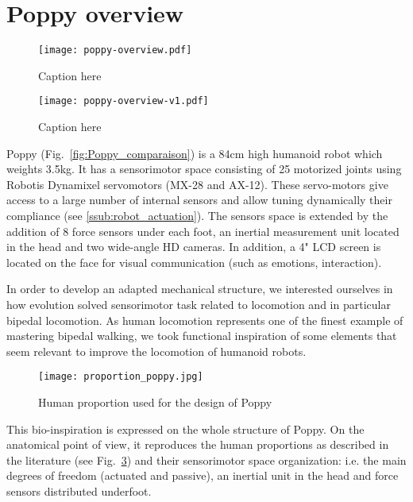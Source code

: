 \section{Poppy overview} %

\begin{figure}[tb]
    \begin{center}
        \texttt{[image: poppy-overview.pdf]}
    \end{center}
    \caption{Caption here}
    \label{fig:poppyv0.1_overview}
\end{figure}

\begin{figure}[tb]
    \begin{center}
        \texttt{[image: poppy-overview-v1.pdf]}
    \end{center}
    \caption{Caption here}
    \label{fig:poppyv1_overview}
\end{figure}

Poppy (Fig.~\ref{fig:Poppy_comparaison}) is a 84cm high humanoid robot which weights 3.5kg.
It has a sensorimotor space consisting of 25 motorized joints using Robotis Dynamixel servomotors (MX-28 and AX-12).
These servo-motors give access to a large number of internal sensors and allow tuning dynamically their compliance (see \ref{ssub:robot_actuation}).
The sensors space is extended by the addition of 8 force sensors under each foot, an inertial measurement unit located in the head and two wide-angle HD cameras.
In addition, a 4" LCD screen is located on the face for visual communication (such as emotions, interaction).


In order to develop an adapted mechanical structure, we interested ourselves in how evolution solved sensorimotor task related to locomotion and in particular bipedal locomotion.
As human locomotion represents one of the finest example of mastering bipedal walking, we took functional inspiration of some elements that seem relevant to improve the locomotion of humanoid robots.

\begin{figure}[thpb]
    \centering
    \texttt{[image: proportion\_poppy.jpg]}
    \caption{Human proportion used for the design of Poppy \cite{dufour2005biomecanique}}
    \label{fig:proportion_poppy}
\end{figure}

This bio-inspiration is expressed on the whole structure of Poppy.
On the anatomical point of view, it reproduces the human proportions as described in the literature \cite{dufour2005biomecanique}  (see Fig.~\ref{fig:proportion_poppy}) and their sensorimotor space organization: i.e.
the main degrees of freedom (actuated and passive), an inertial unit in the head and force sensors distributed underfoot.

